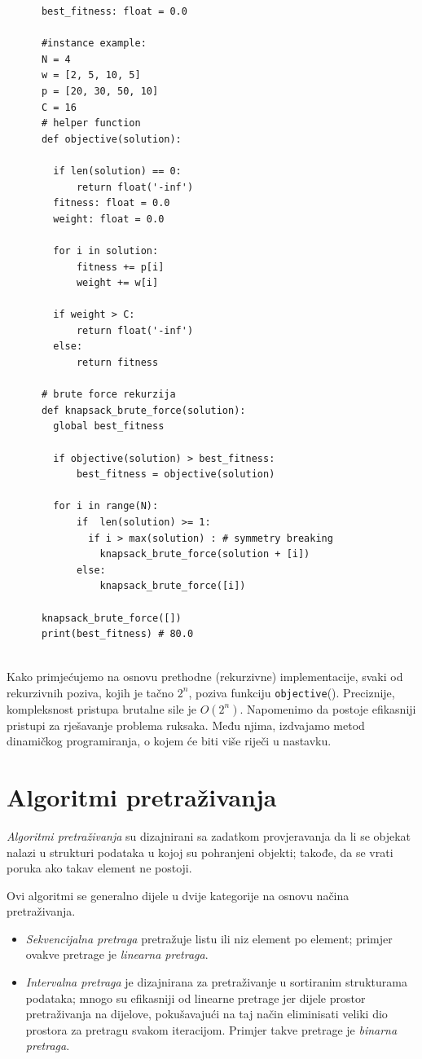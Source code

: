 \begin{verbatim}
	  best_fitness: float = 0.0
	  
	  #instance example:
	  N = 4
	  w = [2, 5, 10, 5]
	  p = [20, 30, 50, 10]
	  C = 16
	  # helper function
	  def objective(solution):
	  
	  	if len(solution) == 0: 
	  		return float('-inf')
	  	fitness: float = 0.0
	  	weight: float = 0.0
	  
	  	for i in solution: 
	  		fitness += p[i]
	  		weight += w[i]
	  
	  	if weight > C:
	  		return float('-inf')
	  	else:
	  		return fitness
	  
	  # brute force rekurzija
	  def knapsack_brute_force(solution): 
	  	global best_fitness
	  
	  	if objective(solution) > best_fitness:
	  		best_fitness = objective(solution) 
	  
	  	for i in range(N):
	  		if  len(solution) >= 1: 
	  		  if i > max(solution) : # symmetry breaking 
	  			knapsack_brute_force(solution + [i]) 
	  		else:
	  			knapsack_brute_force([i]) 
	  
	  knapsack_brute_force([])
	  print(best_fitness) # 80.0	
	  
\end{verbatim}


Kako primjećujemo na osnovu prethodne (rekurzivne) implementacije, svaki od  
rekurzivnih poziva, kojih je tačno $2^n$, poziva funkciju \texttt{objective}(). Preciznije, kompleksnost pristupa brutalne sile je $O(2^n)$. Napomenimo da postoje efikasniji pristupi za rješavanje problema ruksaka. Među njima, izdvajamo metod dinamičkog programiranja, o kojem će biti više riječi u nastavku.


\section{Algoritmi pretraživanja}
\textit{Algoritmi pretraživanja} su dizajnirani sa zadatkom provjeravanja da li se objekat nalazi   u strukturi podataka u kojoj su  pohranjeni objekti; takođe,  da se vrati poruka ako takav element ne postoji.

Ovi algoritmi se generalno dijele u dvije kategorije na osnovu načina pretraživanja.

\begin{itemize}
	\item \textit{Sekvencijalna pretraga}  pretražuje listu ili niz element po element; primjer ovakve pretrage je \textit{linearna pretraga}.
	\item \textit{Intervalna pretraga} je   dizajnirana za pretraživanje u sortira\-nim struktu\-rama podataka; mnogo su efikasniji od linearne pretrage jer dijele prostor pretraživanja na dijelove,  pokušavajući na taj način eliminisati veliki dio prostora za pretragu svakom iteracijom. Primjer takve pretrage je \textit{binarna pretraga}.
\end{itemize}

